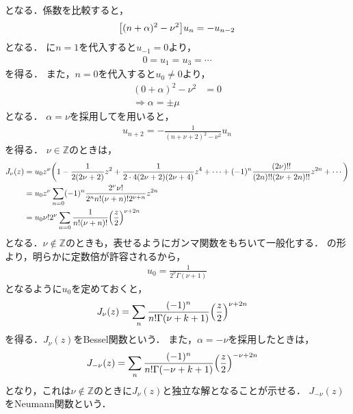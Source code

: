 \documentclass{report}
\begin{document}
    となる．係数を比較すると，
    \begin{align}
      \qty[(n + \alpha)^2 - \nu^2]u_n = -u_{n - 2}\label{bessel-func-recurr}
    \end{align}
    となる．
    に$n = 1$を代入すると$u_{-1} = 0$より，
    \begin{align}
      0 = u_1 = u_3 = \cdots
    \end{align}
    を得る．
    また，$n = 0$を代入すると$u_0 \neq 0$より，
    \begin{align}
      (0 + \alpha)^2 - \nu^2 &= 0 \\ 
      \Rightarrow \alpha = \pm \mu
    \end{align}
    となる．
    $\alpha = \nu$を採用してを用いると，
    \begin{align}
      u_{n + 2} = -\frac{1}{(n + \nu + 2)^2 - \nu^2}u_n 
    \end{align}
    を得る．
    $\nu \in \mathbb{Z}$のときは，
    \begin{align}
      J_{\nu}(z) &= u_0z^{\nu}\qty(1 - \frac{1}{2(2\nu + 2)}z^2 + \frac{1}{2\cdot 4(2\nu + 2)(2\nu + 4)}z^4 + \cdots + (-1)^n\frac{(2\nu)!!}{(2n)!!(2\nu + 2n)!!}z^{2n} + \cdots) \\ 
      &= u_0z^{\nu}\sum_{n = 0}(-1)^n\frac{2^{\nu}\nu!}{2^nn!(\nu + n)!2^{\nu + n}} z^{2n} \\ 
      &= u_0\nu!2^{\nu}\sum_{n = 0}\frac{1}{n!(\nu + n)!}\qty(\frac{z}{2})^{\nu + 2n}
    \end{align}
    となる．$\nu \notin \mathbb{Z}$のときも，表せるようにガンマ関数をもちいて一般化する．
    の形より，明らかに定数倍が許容されるから，
    \begin{align}
      u_0 = \frac{1}{2^{\nu}\Gamma(\nu + 1)}
    \end{align}
    となるように$u_0$を定めておくと，
    \begin{align}
      J_{\nu}(z) &= \sum_{n}\frac{(-1)^n}{n!\Gamma(\nu + k + 1)}\qty(\frac{z}{2})^{\nu + 2n}
    \end{align}
    を得る．$J_{\nu}(z)$をBessel関数という．
    また，$\alpha = -\nu$を採用したときは，
    \begin{align}
      J_{-\nu}(z) &= \sum_{n}\frac{(-1)^n}{n!\Gamma(-\nu + k + 1)}\qty(\frac{z}{2})^{-\nu + 2n}
    \end{align}
    となり，これは$\nu \notin \mathbb{Z}$のときに$J_{\nu}(z)$と独立な解となることが示せる．
    $J_{-\nu}(z)$をNeumann関数という．
    \par
\end{document}
